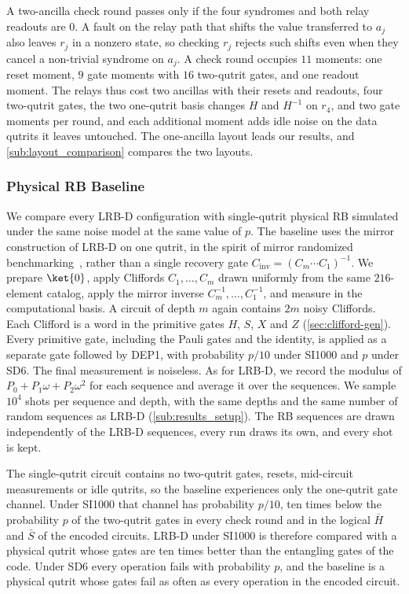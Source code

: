 A two-ancilla check round passes only if the four syndromes and both relay readouts are $0$. A fault on the relay path that shifts the value transferred to $a_j$ also leaves $r_j$ in a nonzero state, so checking $r_j$ rejects such shifts even when they cancel a non-trivial syndrome on $a_j$. A check round occupies $11$ moments: one reset moment, $9$ gate moments with $16$ two-qutrit gates, and one readout moment. The relays thus cost two ancillas with their resets and readouts, four two-qutrit gates, the two one-qutrit basis changes $H$ and $H^{-1}$ on $r_4$, and two gate moments per round, and each additional moment adds idle noise on the data qutrits it leaves untouched. The one-ancilla layout leads our results, and \autoref{sub:layout_comparison} compares the two layouts.



\subsubsection{Physical RB Baseline}
\label{sub:rb_baseline}

We compare every LRB-D configuration with single-qutrit physical RB simulated under the same noise model at the same value of $p$. The baseline uses the mirror construction of LRB-D on one qutrit, in the spirit of mirror randomized benchmarking~\cite{Proctor2022MirrorRB}, rather than a single recovery gate $C_{\text{inv}} = (C_m \cdots C_1)^{-1}$. We prepare $\ket{0}$, apply Cliffords $C_1, \dots, C_m$ drawn uniformly from the same $216$-element catalog, apply the mirror inverse $C_m^{-1}, \dots, C_1^{-1}$, and measure in the computational basis. A circuit of depth $m$ again contains $2m$ noisy Cliffords. Each Clifford is a word in the primitive gates $H$, $S$, $X$ and $Z$ (\autoref{sec:clifford-gen}). Every primitive gate, including the Pauli gates and the identity, is applied as a separate gate followed by DEP1, with probability $p/10$ under SI1000 and $p$ under SD6. The final measurement is noiseless. As for LRB-D, we record the modulus of $P_0 + P_1\omega + P_2\omega^2$ for each sequence and average it over the sequences. We sample $10^4$ shots per sequence and depth, with the same depths and the same number of random sequences as LRB-D (\autoref{sub:results_setup}). The RB sequences are drawn independently of the LRB-D sequences, every run draws its own, and every shot is kept.

The single-qutrit circuit contains no two-qutrit gates, resets, mid-circuit measurements or idle qutrits, so the baseline experiences only the one-qutrit gate channel. Under SI1000 that channel has probability $p/10$, ten times below the probability $p$ of the two-qutrit gates in every check round and in the logical $\bar H$ and $\bar S$ of the encoded circuits. LRB-D under SI1000 is therefore compared with a physical qutrit whose gates are ten times better than the entangling gates of the code. Under SD6 every operation fails with probability $p$, and the baseline is a physical qutrit whose gates fail as often as every operation in the encoded circuit.

